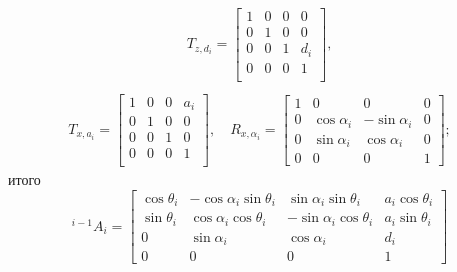 \begin{enumerate}
\begin{gather}
        T_{z, d_i} =
        \begin{bmatrix}
            1 & 0 & 0 & 0\\
            0 & 1 & 0 & 0\\
            0 & 0 & 1 & d_i\\
            0 & 0 & 0 & 1\\
        \end{bmatrix}\!\!,\\
\end{gather}
\begin{gather}   %
        T_{x, a_i} =
        \begin{bmatrix}
            1 & 0 & 0 & a_i\\
            0 & 1 & 0 & 0\\
            0 & 0 & 1 & 0\\
            0 & 0 & 0 & 1\\
        \end{bmatrix}\!\!,
        \quad
        R_{x, \alpha_i} =
        \begin{bmatrix}
            1 & 0 & 0 & 0\\
            0 & \cos\alpha_i & -\sin\alpha_i & 0\\
            0 & \sin\alpha_i &  \cos\alpha_i & 0\\
            0 & 0 & 0 & 1
        \end{bmatrix}\!\!;
    \end{gather}
    итого
    \begin{equation}
        {}^{i-1}A_i =
        \begin{bmatrix}
            \cos\theta_i & - \cos\alpha_i \sin\theta_i & \sin\alpha_i \sin\theta_i & a_{i} \cos\theta_i\\
            \sin\theta_i & \cos\alpha_i \cos\theta_i & - \sin\alpha_i \cos\theta_i & a_{i} \sin\theta_i\\
            0 & \sin\alpha_i & \cos\alpha_i & d_{i}\\
            0 & 0 & 0 & 1
        \end{bmatrix}
    \end{equation}
\end{enumerate}

